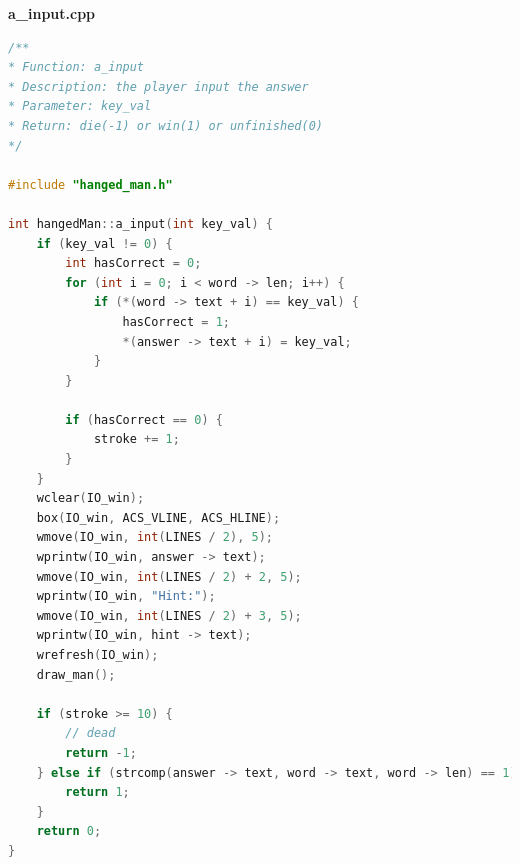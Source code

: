 \documentclass{article}
\begin{document}
        \textbf{a\_input.cpp}
        \begin{lstlisting}[language={cpp}]
/**
* Function: a_input
* Description: the player input the answer
* Parameter: key_val
* Return: die(-1) or win(1) or unfinished(0)
*/

#include "hanged_man.h"

int hangedMan::a_input(int key_val) {
    if (key_val != 0) {
        int hasCorrect = 0;
        for (int i = 0; i < word -> len; i++) {
            if (*(word -> text + i) == key_val) {
                hasCorrect = 1;
                *(answer -> text + i) = key_val;
            }
        }
        
        if (hasCorrect == 0) {
            stroke += 1;
        }
    }
    wclear(IO_win);
    box(IO_win, ACS_VLINE, ACS_HLINE);
    wmove(IO_win, int(LINES / 2), 5);
    wprintw(IO_win, answer -> text);
    wmove(IO_win, int(LINES / 2) + 2, 5);
    wprintw(IO_win, "Hint:");
    wmove(IO_win, int(LINES / 2) + 3, 5);
    wprintw(IO_win, hint -> text);
    wrefresh(IO_win);
    draw_man();
    
    if (stroke >= 10) {
        // dead
        return -1;
    } else if (strcomp(answer -> text, word -> text, word -> len) == 1) {
        return 1;
    }
    return 0;
}
        \end{lstlisting}
\end{document}
